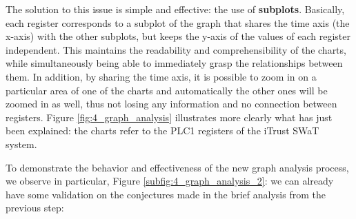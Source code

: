 The solution to this issue is simple and effective: the use of \textbf{subplots}. Basically, each register corresponds to a subplot of the graph that shares the time axis (the x-axis) with the other subplots, but keeps the y-axis of the values of each register independent. This maintains the readability and comprehensibility of the charts, while simultaneously being able to immediately grasp the relationships between them. In addition, by sharing the time axis, it is possible to zoom in on a particular area of one of the charts and automatically the other ones will be zoomed in as well, thus not losing any information and no connection between registers. Figure \ref{fig:4_graph_analysis} illustrates more clearly what has just been explained: the charts refer to the PLC1 registers of the iTrust SWaT system.

\bigskip
To demonstrate the behavior and effectiveness of the new graph analysis process, we observe in particular, Figure \ref{subfig:4_graph_analysis_2}: we can already have some validation on the conjectures made in the brief analysis from the previous step:

